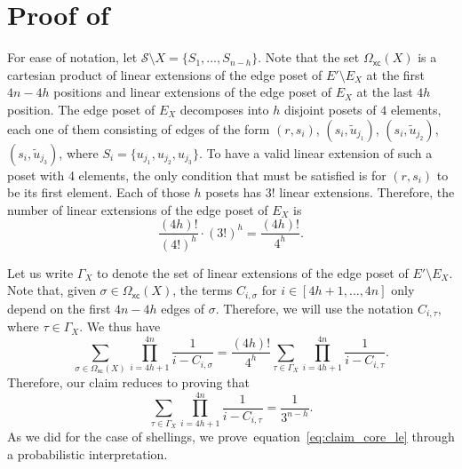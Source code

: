 \documentclass[11pt]{amsart}
\newcommand{\nou}{\tilde{u}}
\newcommand{\omxc}{\Omega_{\mathsf{xc}}}
\begin{document}
\section{Proof of~} \label{subsec:claim_nfree}
For ease of notation, let $\mathcal{S} \setminus X = \{S_1, \dots, S_{n-h}\}$.
% 
Note that the set $\omxc(X)$ is a cartesian product of linear extensions of the edge poset of $E' \setminus E_X$ at the first $4n-4h$ positions and linear extensions of the edge poset of $E_X$ at the last $4h$ position. The edge poset of $E_X$ decomposes into $h$ disjoint posets of $4$ elements, each one of them consisting of edges of the form $(r, s_i)$, $(s_i, \nou_{j_1})$, 
$(s_i, \nou_{j_2})$,
$(s_i, \nou_{j_3})$, where $S_i = \{u_{j_1}, u_{j_2}, u_{j_3}\}$. To have a valid linear extension of such a poset with 4 elements, the only condition that must be satisfied is for $(r, s_i)$ to be its first element. Each of those $h$ posets has $3!$ linear extensions. Therefore, the number of linear extensions of the edge poset of $E_X$ is
$$\frac{(4h)!}{(4!)^h} \cdot (3!)^h = \frac{(4h)!}{4^h}.$$

Let us write $\Gamma_X$ to denote the set of linear extensions of the edge poset of $E' \setminus E_X$. Note that, given $\sigma \in \omxc(X)$, the terms $C_{i, \sigma}$ for $i \in [4h+1, \dots, 4n]$ only depend on the first $4n-4h$ edges of $\sigma$. Therefore, we will use the notation $C_{i, \tau}$, where $\tau \in \Gamma_X$. We thus have
    \[
    \sum_{\sigma \in\omxc(X)} \prod_{i=4h+1}^{4n} \frac{1}{i-C_{i, \sigma}} = \frac{(4h)!}{4^h} \sum_{\tau \in\Gamma_X} \prod_{i=4h+1}^{4n} \frac{1}{i-C_{i, \tau}}.
    \]
Therefore, our claim reduces to proving that
      \begin{equation}\label{eq:claim_core_le}
          \sum_{\tau \in \Gamma_X} \prod_{i=4h+1}^{4n} \frac{1}{i-C_{i, \tau}} = \frac{1}{3^{n-h}}.
      \end{equation}
As we did for the case of shellings, we prove~equation~\eqref{eq:claim_core_le} through a probabilistic interpretation.
\end{document}
